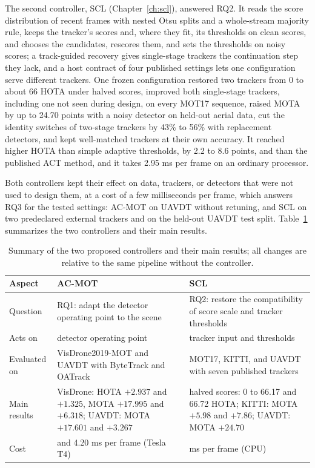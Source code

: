 The second controller, SCL (Chapter~\ref{ch:scl}), answered RQ2. It reads the score distribution of recent frames with nested Otsu splits and a whole-stream majority rule, keeps the tracker's scores and, where they fit, its thresholds on clean scores, and chooses the candidates, rescores them, and sets the thresholds on noisy scores; a track-guided recovery gives single-stage trackers the continuation step they lack, and a host contract of four published settings lets one configuration serve different trackers. One frozen configuration restored two trackers from 0 to about 66 HOTA under halved scores, improved both single-stage trackers, including one not seen during design, on every MOT17 sequence, raised MOTA by up to 24.70 points with a noisy detector on held-out aerial data, cut the identity switches of two-stage trackers by 43\% to 56\% with replacement detectors, and kept well-matched trackers at their own accuracy. It reached higher HOTA than simple adaptive thresholds, by 2.2 to 8.6 points, and than the published ACT method, and it takes 2.95 ms per frame on an ordinary processor.

Both controllers kept their effect on data, trackers, or detectors that were not used to design them, at a cost of a few milliseconds per frame, which answers RQ3 for the tested settings: AC-MOT on UAVDT without retuning, and SCL on two predeclared external trackers and on the held-out UAVDT test split. Table~\ref{tab:conc-summary} summarizes the two controllers and their main results.

\begin{table}[tbp]
\centering
\caption{Summary of the two proposed controllers and their main results; all changes are relative to the same pipeline without the controller.}
\label{tab:conc-summary}
\begin{tabular}{>{\raggedright\arraybackslash}p{2.7cm}>{\raggedright\arraybackslash}p{5.6cm}>{\raggedright\arraybackslash}p{5.6cm}}
\toprule
Aspect & AC-MOT & SCL\\
\midrule
Question & RQ1: adapt the detector operating point to the scene & RQ2: restore the compatibility of score scale and tracker thresholds\\
Acts on & detector operating point & tracker input and thresholds\\
Evaluated on & VisDrone2019-MOT and UAVDT with ByteTrack and OATrack & MOT17, KITTI, and UAVDT with seven published trackers\\
Main results & VisDrone: HOTA $+2.937$ and $+1.325$, MOTA $+17.995$ and $+6.318$; UAVDT: MOTA $+17.601$ and $+3.267$ & halved scores: 0 to 66.17 and 66.72 HOTA; KITTI: MOTA $+5.98$ and $+7.86$; UAVDT: MOTA $+24.70$\\
Cost & 4.26 and 4.20 ms per frame (Tesla T4) & 2.95 ms per frame (CPU)\\
\bottomrule
\end{tabular}
\end{table}

